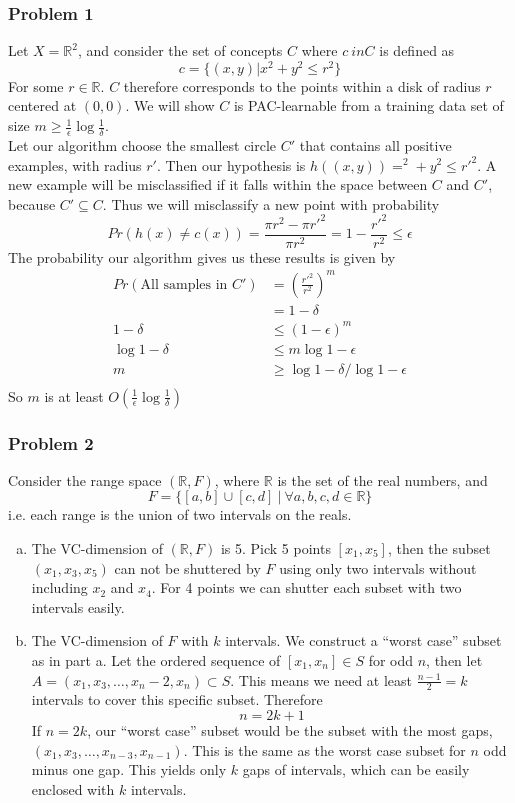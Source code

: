 \documentclass[12pt,letterpaper]{article}
\newenvironment{answer}[1]{
  \subsubsection*{Problem #1}
}{\newpage}
\newcommand\R{\mathbb{R}}
\begin{document}
\begin{answer}{1}
Let $X = \R^2$, and consider the set of concepts $C$ where $c \ in C$ is defined as
		$$ c = \{(x,y) | x^2 + y^2 \le r^2\} $$
For some $r \in \R$. $C$ therefore corresponds to the points within a disk of radius $r$ centered at $(0,0)$. We will show $C$ is PAC-learnable from a training data set of size $m \ge \frac{1}{\epsilon}\log{\frac{1}{\delta}}$.\\
Let our algorithm choose the smallest circle $C'$ that contains all positive examples, with radius $r'$. Then our hypothesis is $h((x,y)) = ^2+ y^2 \le r'^2$. A new example will be misclassified if it falls within the space between $C$ and $C'$, because $C' \subseteq C$. Thus we will misclassify a new point with probability
	$$ Pr(h(x) \ne c(x)) = \frac{\pi r^2 - \pi r'^2}{\pi r^2} = 1 - \frac{r'^2}{r^2} \le \epsilon$$
The probability our algorithm gives us these results is given by
	\begin{align*}
	Pr(\text{All samples in $C'$}) &= \left(\frac{r'^2}{r^2}\right)^m\\
		&= 1 - \delta\\
	1 - \delta &\le (1-\epsilon)^m\\
	\log{1-\delta} &\le m\log{1-\epsilon}\\
	m  &\ge \log{1-\delta}/\log{1-\epsilon}\\
	\end{align*}
	So $m$ is at least $O(\frac{1}{\epsilon}\log{\frac{1}{\delta}})$
\end{answer}

\begin{answer}{2}
Consider the range space $(\R,F)$, where $\R$ is the set of the real numbers, and
	$$F = \{[a,b]\cup[c,d]  \ |\  \forall a,b,c,d\in \R\}$$
i.e. each range is the union of two intervals on the reals.

\begin{enumerate}[a)]
	\item The VC-dimension of $(\R,F)$ is 5. Pick 5 points $[x_1,x_5]$, then the subset $(x_1,x_3,x_5)$ can not be shuttered by $F$ using only two intervals without including $x_2$ and $x_4$. For 4 points we can shutter each subset with two intervals easily.
	\item The VC-dimension of $F$ with $k$ intervals. We construct a ``worst case'' subset as in part a. Let the ordered sequence of $[x_1, x_n] \in S$ for odd $n$, then let $A = (x_1, x_3, \ldots, x_n-2, x_n) \subset S$. This means we need at least $\frac{n-1}{2} = k$ intervals to cover this specific subset. Therefore
		$$ n = 2k + 1 $$
	If $n = 2k$, our ``worst case'' subset would be the subset with the most gaps, $(x_1, x_3, \ldots, x_{n-3}, x_{n-1})$. This is the same as the worst case subset for $n$ odd minus one gap. This yields only $k$ gaps of intervals, which can be easily enclosed with $k$ intervals.
\end{enumerate}
\end{answer}
\end{document}
